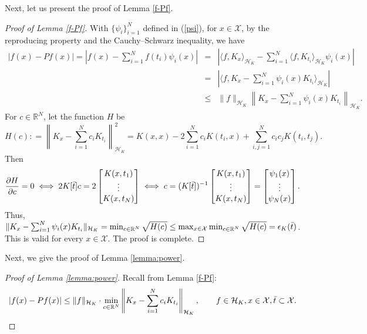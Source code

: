 \documentclass{article}
\def\RR{\mathbb R}
\numberwithin{equation}{section}
\begin{document}
\begin{appendices}
Next, let us present the proof of Lemma \ref{f-Pf}.
\begin{proof}[Proof of Lemma \ref{f-Pf}]
    With $\{\psi_i\}_{i=1}^N$ defined in (\ref{psi}), for  $x\in \mathcal{X}$, by the reproducing property and the Cauchy–Schwarz inequality, we have 
    \begin{eqnarray*}
        |f(x) - Pf(x)| = \left|f(x)-\sum_{i=1}^N f(t_i)\psi_i(x)\right| &=& \left|\langle f, K_x \rangle_{\mathcal{H}_K} -\sum_{i=1}^N \langle f, K_{t_i}\rangle_{\mathcal{H}_K} \psi_i(x) \right|\\
        &=& \left|\langle f, K_x -  \sum_{i=1}^N \psi_i(x)  K_{t_i} \rangle_{\mathcal{H}_K}\right|\\
        &\leq&  \|f\|_{\mathcal{H}_K} \left\|K_x -  \sum_{i=1}^N \psi_i(x)  K_{t_i}\right\|_{\mathcal{H}_K}.
    \end{eqnarray*}
    For $c\in \RR^N$, let the function $H$ be $$H(c) : = \left\|K_x -  \sum_{i=1}^N c_i  K_{t_i}\right\|^2_{\mathcal{H}_K} = K(x,x) -2  \sum_{i=1}^N c_i K(t_i,x)+ \sum_{i,j=1}^N c_i c_j K(t_i, t_j).$$ 
    Then \begin{eqnarray*}
        \frac{\partial H}{\partial c} = 0 \iff 2 K[\Bar{t}] c = 2 \begin{bmatrix}
            K(x, t_1)\\
            \vdots\\
            K(x,t_N)
        \end{bmatrix} \iff c = (K[\Bar{t}])^{-1 } \begin{bmatrix}
            K(x, t_1)\\
            \vdots\\
            K(x,t_N)
        \end{bmatrix} = \begin{bmatrix}
           \psi_1(x)\\
           \vdots\\
           \psi_N(x)
       \end{bmatrix}.
    \end{eqnarray*}
    Thus, $\|K_x -  \sum_{i=1}^N \psi_i(x)  K_{t_i}\|_{\mathcal{H}_K} = \min_{c\in \RR^N} \sqrt{H(c)} \leq \max_{x\in \mathcal{X}} \min_{c\in\RR^N}  \sqrt{H(c)} =  \epsilon_K(\Bar{t})$. This is valid for every $x \in \mathcal{X}$. The proof is complete.
\end{proof}  

Next, we give the proof of Lemma \ref{lemma:power}.
\begin{proof}[Proof of Lemma \ref{lemma:power}]
Recall from Lemma \ref{f-Pf}: 
\begin{equation*}
    |f(x) - Pf(x)|  \leq \|f\|_{\mathcal{H}_K} \cdot \min_{c\in\RR^N}\left\|K_x - \sum_{i=1}^N c_i K_{t_i}\right\|_{\mathcal{H}_K}, \qquad f\in \mathcal{H}_K, x\in \mathcal{X}, \Bar{t} \subset \mathcal{X}.
\end{equation*}


\end{proof}
\end{appendices}
\end{document}
